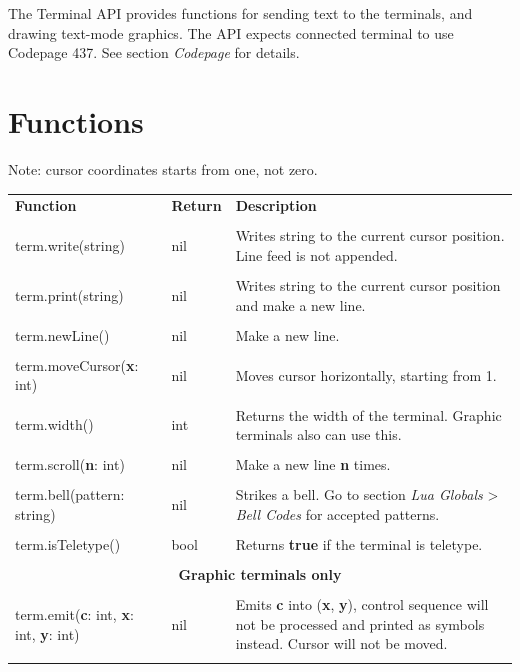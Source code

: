 The Terminal API provides functions for sending text to the terminals, and drawing text-mode graphics. The API expects connected terminal to use Codepage 437. See section \emph{Codepage} for details.

\section{Functions}

Note: cursor coordinates starts from one, not zero.

\begin{tabularx}{\textwidth}{l l X}
	\textbf{\large Function} & \textbf{\large Return} & \textbf{\large Description}
	\\ \\
	\endhead
	term.write(string) & nil & Writes string to the current cursor position. Line feed is not appended.
	\\ \\
	term.print(string) & nil & Writes string to the current cursor position and make a new line.
	\\ \\
	term.newLine() & nil & Make a new line.
	\\ \\
	term.moveCursor(\textbf{x}: int) & nil & Moves cursor horizontally, starting from 1.
	\\ \\
	term.width() & int & Returns the width of the terminal. Graphic terminals also can use this.
	\\ \\
	term.scroll(\textbf{n}: int) & nil & Make a new line \textbf{n} times.
	\\ \\
	term.bell(pattern: string) & nil & Strikes a bell. Go to section \emph{Lua Globals} > \emph{Bell Codes} for accepted patterns.
	\\ \\
	term.isTeletype() & bool & Returns \textbf{true} if the terminal is teletype.
	\\ \\
	\multicolumn{3}{c}{\textbf{Graphic terminals only}}
	\\ \\
	term.emit(\textbf{c}: int, \textbf{x}: int, \textbf{y}: int) & nil & Emits \textbf{c} into (\textbf{x}, \textbf{y}), control sequence will not be processed and printed as symbols instead. Cursor will not be moved.
	\\ \\

\end{tabularx}

